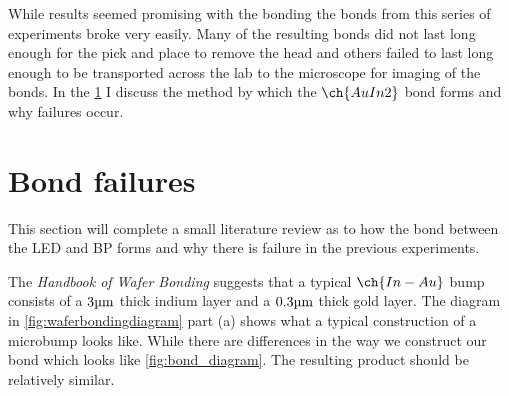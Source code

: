 While results seemed promising with the bonding the bonds from this series of experiments broke very easily. Many of the resulting bonds did not last long enough for the pick and place to remove the head and others failed to last long enough to be transported across the lab to the microscope for imaging of the bonds.
In the \ref{sec:bond_failures} I discuss the method by which the $\ch{AuIn2}$ bond forms and why failures occur.


\section{Bond failures}
\label{sec:bond_failures}

This section will complete a small literature review as to how the bond between the LED and BP forms and why there is failure in the previous experiments.

The \emph{Handbook of Wafer Bonding} \cite{waferBondingHandbook} suggests that a typical $\ch{In-Au}$ bump consists of a $3\um$ thick indium layer and a $0.3\um$ thick gold layer. The diagram in \ref{fig:waferbondingdiagram} part (a) shows what a typical construction of a microbump looks like. While there are differences in the way we construct our bond which looks like \ref{fig:bond_diagram}. The resulting product should be relatively similar.

